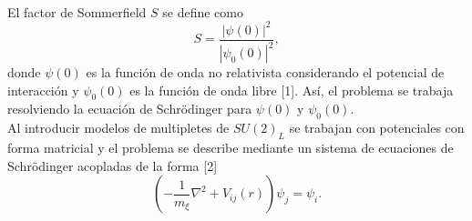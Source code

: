 \documentclass[11pt,spanish]{article}
\newcommand{\seccion}[1]{\noindent {\Large\textbf{#1}}\\}
\begin{document}


\seccion{Desarrollo}
\noindent
El factor de Sommerfield $S$ se define como
\begin{equation}
	S = \frac{|\psi(0)|^2}{|\psi_0(0)|^2},
\end{equation}
donde $\psi(0)$ es la función de onda no relativista considerando el potencial de interacción y $\psi_0(0)$ es la función de onda libre [1]. Así, el problema se trabaja resolviendo la ecuación de Schrödinger para $\psi(0)$ y $\psi_0(0)$. \\
Al introducir modelos de multipletes de $SU(2)_L$ se trabajan con potenciales con forma matricial y el problema se describe mediante un sistema de ecuaciones de Schrödinger acopladas de la forma [2]
\begin{equation}
	\left(-\frac{1}{m_\xi}\nabla^2 + V_{ij}(r)\right)\psi_j = \psi_i.
\end{equation}







\end{document}
